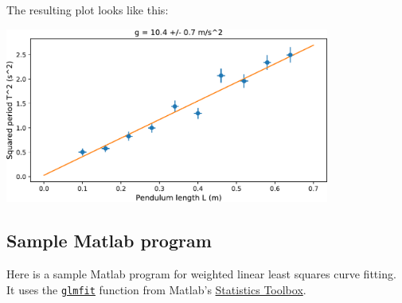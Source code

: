 \documentclass[11pt,a4paper]{article}
\begin{document}
The resulting plot looks like this:
\begin{center}
  \includegraphics[width=0.8\textwidth]{errorpy.pdf}
\end{center}

\subsection{Sample Matlab program}

Here is a sample Matlab program for weighted linear least squares
curve fitting.  It uses the
\href{https://www.mathworks.com/help/stats/glmfit.html}{\texttt{glmfit}}
function from Matlab's
\href{https://www.mathworks.com/help/stats/index.html}{Statistics
  Toolbox}.
\end{document}
